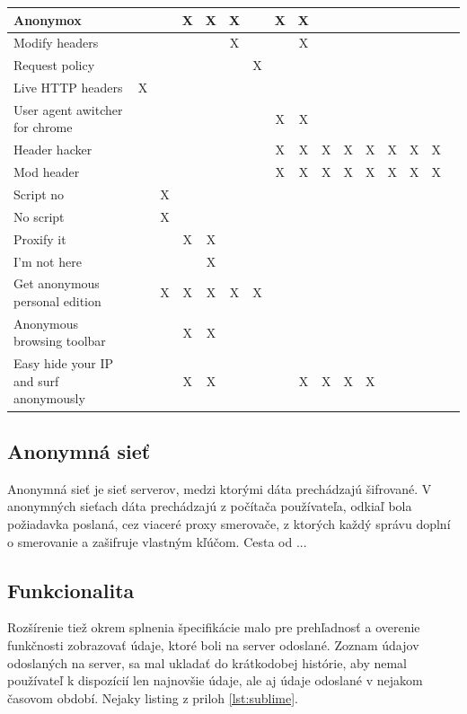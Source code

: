 \begin{table}[!htbp]
\begin{center}
\begin{tabular}{p{4cm}|c|c|c|c|c|c|c|c|c|c|c|c|c|c|c}
Anonymox &  && X & X & X &  & X & X & & & & & & \\  \hline
Modify headers & & &  &  & X &  &  & X &  &  &  & & &  \\  \hline
Request policy & & &  &  & & X  &  &  &  &  &  & & &   \\  \hline
Live HTTP headers & X& &  &  & &  &  &  &  &  &  & & &   \\  \hline
User agent awitcher for chrome & & &  &  & &  & X & X &  &  &  & & &   \\  \hline
Header hacker & & &  &  & &  & X & X & X & X & X & X & X & X    \\  \hline
Mod header & & &  &  & &  & X & X & X & X & X & X & X & X    \\  \hline
Script no & &X &  &  & &  &  &  &  &  &  &  &  &     \\  \hline
No script & &X &  &  & &  &  &  &  &  &  &  &  &     \\  \hline
Proxify it & & &X  & X & &  &  &  &  &  &  &  &  &     \\  \hline
I'm not here & & &  & X & &  &  &  &  &  &  &  &  &     \\  \hline
Get anonymous personal edition & &X &X &X &X&X &  &  &  &  &  &  &  &     \\  \hline
Anonymous browsing toolbar & & & X & X & &  &  &  &  &  &  &  &  &     \\  \hline
Easy hide your IP and surf anonymously & & & X & X& &  &  & X & X & X & X &  &  &     \\  \hline
\end{tabular}
\end{center}
\end{table}

\subsection{Anonymná sieť}
\noindent Anonymná sieť je sieť serverov, medzi ktorými dáta prechádzajú šifrované. V anonymných sieťach dáta prechádzajú z počítača používateľa, odkiaľ bola požiadavka poslaná, cez viaceré proxy smerovače, z ktorých každý správu doplní o smerovanie a zašifruje vlastným kľúčom. Cesta od ...


\subsection{Funkcionalita}
\noindent  Rozšírenie tiež okrem splnenia špecifikácie malo pre prehľadnosť a overenie funkčnosti zobrazovať údaje, ktoré boli na server odoslané. Zoznam údajov odoslaných na server, sa mal ukladať do krátkodobej histórie, aby nemal používateľ k dispozícií len najnovšie údaje, ale aj údaje odoslané v nejakom časovom období. Nejaky listing z priloh \ref{lst:sublime}.

